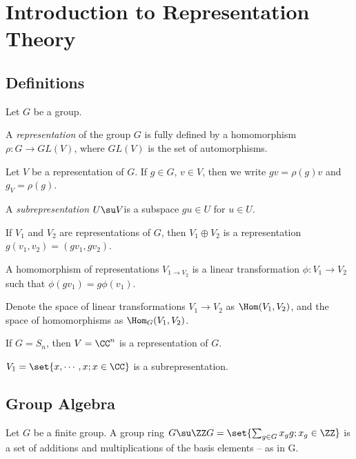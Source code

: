 \documentclass[11pt]{scrartcl}
\begin{document}
  \section{Introduction to Representation Theory}

  \subsection{Definitions}
  Let $G$ be a group.

  \begin{definition}
    A \textit{representation} of the group $G$ is fully defined by a
    homomorphism $\rho: G \to GL(V)$, where $GL(V)$ is the set of
    automorphisms.

    Let $V$ be a representation of $G$. If $g\in G$, $v\in V$, then we
    write $gv = \rho(g)v$ and $g_{V} = \rho(g)$.

    A \textit{subrepresentation} $U \su V$is a subspace $gu \in U$ for $u \in U$.

    If $V_{1}$ and $V_{2}$ are representations of $G$, then
    $V_{1}\oplus V_{2}$ is a representation
    $g(v_{1}, v_{2}) = (gv_{1}, gv_{2})$.

    A homomorphism of representations $V_{1 \to V_{2}}$ is a linear
    transformation $\phi: V_{1} \to V_{2}$ such that
    $\phi(gv_{1}) = g\phi(v_{1})$.

    Denote the space of linear transformations $V_{1} \to V_{2}$ as
    $\Hom(V_{1}, V_{2})$, and the space of homomorphisms
    as $\Hom_{G}(V_{1}, V_{2})$.
    
  \end{definition}
  \begin{example}

    If $G = S_{n}$, then $V = \CC^{n}$ is a representation of $G$.
    
    $V_{1} = \set{x, \cdots, x; x\in\CC} $ is a subrepresentation.

  \end{example}

  \subsection{Group Algebra}

  \begin{definition}
    Let $G$ be a finite group. A group ring
    $G \su \ZZ G = \set{\sum_{g\in G}x_{g}g; x_{g} \in \ZZ}$ is a set
    of additions and multiplications of the basis elements -- as in G.
  \end{definition}
\end{document}
